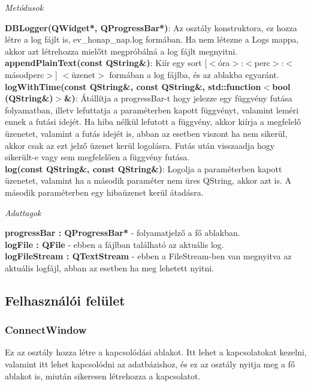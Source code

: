 \begin{flushleft}
\textit{Metódusok}
\end{flushleft}
\textbf{DBLogger(QWidget*, QProgressBar*)}: Az osztály konstruktora, ez hozza létre a log fájlt is, ev\_honap\_nap.log formában. Ha nem létezne a Logs mappa, akkor azt létrehozza mielőtt megpróbálná a log fájlt megnyitni. \\
\textbf{appendPlainText(const QString\&)}: Kiír egy sort [$<$óra$>$:$<$perc$>$:$<$másodperc$>$] $<$üzenet$>$ formában a log fájlba, és az ablakba egyaránt. \\
\textbf{logWithTime(const QString\&, const QString\&, std::function$<$bool (QString\&)$>$\&)}: Átállítja a progressBar-t hogy jelezze egy függvény futása folyamatban, illetv lefuttatja a paraméterben kapott függvényt, valamint leméri ennek a futási idejét. Ha hiba nélkül lefutott a függvény, akkor kiírja a megfelelő üzenetet, valamint a futás idejét is, abban az esetben viszont ha nem sikerül, akkor csak az ezt jelző üzenet kerül logolásra. Futás után visszaadja hogy sikerült-e vagy sem megfelelően a függvény futása. \\
\textbf{log(const QString\&, const QString\&)}: Logolja a paraméterben kapott üzenetet, valamint ha a második paraméter nem üres QString, akkor azt is. A második paraméterben egy hibaüzenet kerül átadásra.

\begin{flushleft}
\textit{Adattagok}
\end{flushleft}
\textbf{progressBar : QProgressBar*} - folyamatjelző a fő ablakban. \\
\textbf{logFile : QFile} - ebben a fájlban található az aktuális log. \\
\textbf{logFileStream : QTextStream} - ebben a FileStream-ben van megnyitva az aktuális logfájl, abban az esetben ha meg lehetett nyitni.

\newpage
\subsection{Felhasználói felület}
\subsubsection{ConnectWindow}

Ez az osztály hozza létre a kapcsolódási ablakot. Itt lehet a kapcsolatokat kezelni, valamint itt lehet kapcsolódni az adatbázishoz, és ez az osztály nyitja meg a fő ablakot is, miután sikeresen létrehozza a kapcsolatot.

